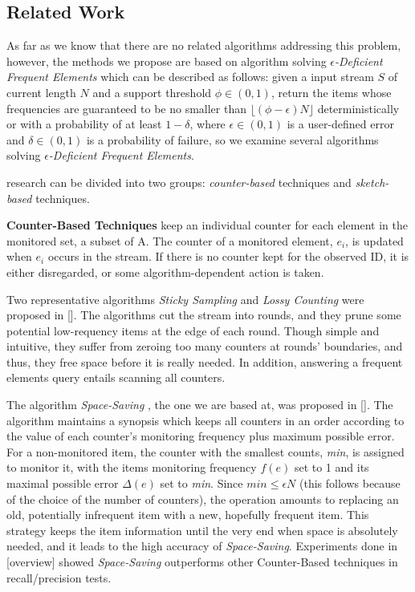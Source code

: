 \documentclass[conference]{IEEEtran}
\begin{document}
\subsection{Related Work}
As far as we know that there are no related algorithms addressing this problem, however, the methods we propose are based on algorithm solving $\epsilon$\emph{-Deficient Frequent Elements} which can be described as follows: given a input stream $S$ of current length $N$ and a support threshold $\phi \in (0,1)$, return the items whose frequencies are guaranteed to be no smaller than $\lfloor(\phi-\epsilon)N\rfloor$ deterministically or with a probability of at least $1-\delta$, where $\epsilon \in (0,1)$ is a user-defined error and $\delta \in (0,1)$ is a probability of failure, so we examine several algorithms solving $\epsilon$\emph{-Deficient Frequent Elements}.\par

research can be divided into two groups: \emph{counter-based} techniques and \emph{sketch-based} techniques.\par

\textbf{Counter-Based Techniques} keep an individual counter for each element in the monitored set, a subset of A. The counter of a monitored element, $e_i$, is updated when $e_i$ occurs in the stream. If there is no counter kept for the observed ID, it is either disregarded, or some algorithm-dependent action is taken.\par

Two representative algorithms \emph{Sticky Sampling} and \emph{Lossy Counting} were proposed in []. The algorithms cut the stream into rounds, and they prune some potential low-requency items at the edge of each round. Though simple and intuitive, they suffer from zeroing too many counters at rounds’ boundaries, and thus, they free space before it is really needed. In addition, answering a frequent elements query entails scanning all counters.\par

The algorithm \emph{Space-Saving} , the one we are based at, was proposed in []. The algorithm maintains a synopsis which keeps all counters in an order according to the value of each counter's monitoring frequency plus maximum possible error. For a non-monitored item, the counter with the smallest counts, \emph{min}, is assigned to monitor it, with the items monitoring frequency $f(e)$ set to 1 and its maximal possible error $\Delta(e)$ set to \emph{min}. Since $min\leq\epsilon N$ (this follows because of the choice of the number of counters), the operation amounts to replacing an old, potentially infrequent item with a new, hopefully frequent item. This strategy keeps the item information until the very end when space is absolutely needed, and it leads to the high accuracy of \emph{Space-Saving}. Experiments done in [overview] showed \emph{Space-Saving} outperforms other Counter-Based techniques in recall/precision tests.\par
\end{document}
